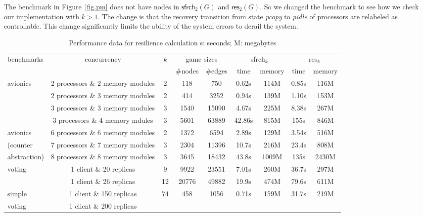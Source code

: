\documentclass[times,10pt,twocolumn]{article}
\newcommand\res{\mathsf{res}}
\newcommand\safe{\mathsf{sfrch}}
\begin{document}
The benchmark in Figure~\ref{fig.pm} does not have nodes in 
$\safe_2(G)$ and $\res_2(G)$.  
So we changed the benchmark to see how we check our implementation 
with $k>1$.  
The change is that the recovery transition from state \textit{pcopy} to 
\textit{pidle}
of processors are relabeled as controllable. 
This change significantly limits the ability of the system errors 
to derail the system.  
\begin{table*}[t] 
\caption{Performance data for resilience calculation \hspace{21mm} s: seconds; M: megabytes} 
\label{tab.perf} 
\begin{center} 
\begin{tabular}{l|c|c|c|c||c|c||c|c} \hline 
benchmarks & concurrency & $k$ & \multicolumn{2}{c||}{game sizes} 
& \multicolumn{2}{c||}{sfrch$_k$}  
			& \multicolumn{2}{c}{res$_k$} \\\cline{4-9} 
	 & 	& & \#nodes & \#edges & time  & memory   & time & memory  \\
\hline \hline 
avionics & 2 processors \& 2 memory modules 
     & 2 & 118 & 750 
     & 0.62s & 114M & 0.85s & 116M \\ \cline{2-9} 
     & 2 processors \& 3 memory modules 
     & 2 & 414 & 3252
     & 0.94s & 139M & 1.10s & 153M \\ \cline{2-9} 
     & 3 processors \& 3 memory modules 
     & 3 & 1540 & 15090 
     & 4.67s & 225M & 8.38s & 267M \\ \cline{2-9} 
     & 3 processors \& 4 memory mdules
     & 3 & 5601 & 63889 
     & 42.86s & 815M & 155s & 846M \\ \hline  
avionics & 6 processors \& 6 memory modules 
	 & 2 & 1372 & 6594 
	 & 2.89s & 129M & 3.54s & 516M \\ \cline{2-9} 
(counter	 & 7 processors \& 7 memory modules 
	 & 3 & 2304 & 11396 
	 & 10.7s & 216M & 23.4s & 808M \\ \cline{2-9}
abstraction)	 & 8 processors \& 8 memory modules 
	 & 3 & 3645 & 18432 
	 & 43.8s & 1009M & 135s & 2430M \\ \hline 
voting	 & 1 client \& 20 replicas 
	 & 9 & 9922 & 23551 & 7.01s & 260M & 36.7s & 297M \\ \cline{2-9} 
	 & 1 client \& 26 replicas 
	 & 12 & 20776 & 49882 & 19.9s & 474M & 79.6s & 611M \\ \hline 
simple	 & 1 client \& 150 replicas 
	 & 74 & 458 & 1056 & 0.71s & 159M & 31.7s & 219M \\ \cline{2-9} 
voting	 & 1 client \& 200 replicas 

\end{tabular}
\end{center}
\end{table*}
\end{document}
